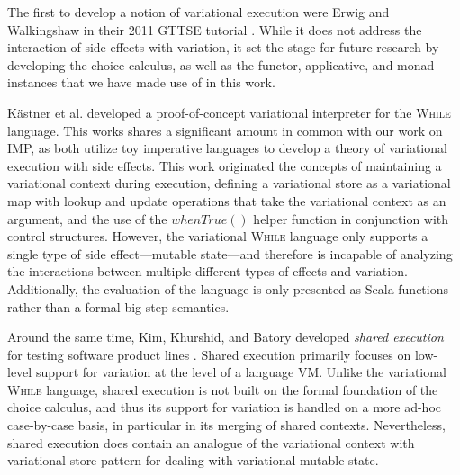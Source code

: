 \documentclass[12pt,oneside]{book}
\begin{document}
The first to develop a notion of variational execution were Erwig and Walkingshaw in their 2011 GTTSE tutorial \cite{EW11gttse}.
While it does not address the interaction of side effects with variation, it set the stage for future research by developing the choice calculus,
as well as the functor, applicative, and monad instances that we have made use of in this work.

 K\"astner et al. \cite{varwhile} developed a proof-of-concept variational interpreter for the \textsc{While} language. This works shares a
 significant amount in common with our work on IMP, as both utilize toy imperative languages to develop a theory of variational execution
 with side effects. This work originated the concepts of maintaining a variational context during execution, defining a variational store as
 a variational map with lookup and update operations that take the variational context as an argument, and the use of the $\mathit{whenTrue}()$
 helper function in conjunction with control structures. However, the variational \textsc{While} language only supports a single type of side
 effect---mutable state---and therefore is incapable of analyzing the interactions between multiple different types of effects and variation.
 Additionally, the evaluation of the language is only presented as Scala functions rather than a formal big-step semantics.
 
 Around the same time, Kim, Khurshid, and Batory developed \emph{shared execution} for testing software product lines \cite{sharedexec}.
 Shared execution primarily focuses on low-level support for variation at the level of a language VM.
 Unlike the variational \textsc{While} language, shared execution is not built on the formal foundation of the choice calculus, and thus its
 support for variation is handled on a more ad-hoc case-by-case basis, in particular in its merging of shared contexts. Nevertheless,
 shared execution does contain an analogue of the variational context with variational store pattern for dealing with variational mutable state.
 
\end{document}
